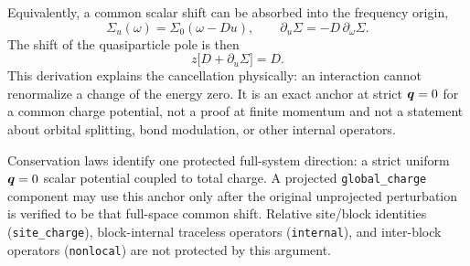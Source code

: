 Equivalently, a common scalar shift can be absorbed into the frequency origin,
\begin{equation}
  \Sigma_u(\omega)=\Sigma_0(\omega-Du),
  \qquad
  \partial_u\Sigma=-D\,\partial_\omega\Sigma.
  \label{eq:selfenergyshift}
\end{equation}
The shift of the quasiparticle pole is then
\begin{equation}
  z\bigl[D+\partial_u\Sigma\bigr]=D.
  \label{eq:protectedshift}
\end{equation}
This derivation explains the cancellation physically: an interaction cannot
renormalize a change of the energy zero.  It is an exact anchor at strict $\bm{q}=0$
for a common charge potential, not a proof at finite momentum and not a statement
about orbital splitting, bond modulation, or other internal operators.

\begin{keypoint}
Conservation laws identify one protected full-system direction: a strict uniform
$\bm{q}=0$ scalar potential coupled to total charge.  A projected
\texttt{global\_charge} component may use this anchor only after the original
unprojected perturbation is verified to be that full-space common shift.
Relative site/block identities (\texttt{site\_charge}), block-internal
traceless operators (\texttt{internal}), and inter-block operators
(\texttt{nonlocal}) are not protected by this argument.
\end{keypoint}
